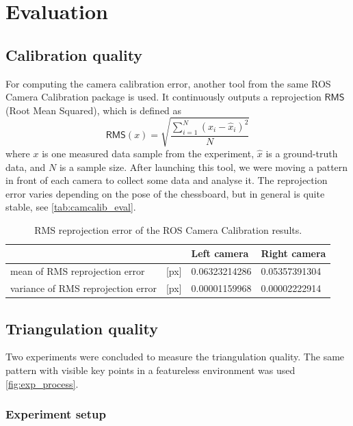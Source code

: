 \chapter{Evaluation}
\label{chapter:evaluation}

\section{Calibration quality}
For computing the camera calibration error, another tool from the same ROS Camera Calibration package is used.
It continuously outputs a reprojection $\mathsf{RMS}$ (Root Mean Squared), which is defined as
\begin{equation}
    \mathsf{RMS}(x) = \sqrt{\frac{\sum_{i=1}^{N}{(x_i - \hat{x}_i)^2}}{N}}
\end{equation}
where $x$ is one measured data sample from the experiment, $\hat{x}$ is a ground-truth data, and $N$ is a sample size.
After launching this tool, we were moving a pattern in front of each camera to collect some data and analyse it.
The reprojection error varies depending on the pose of the chessboard, but in general is quite stable, see \autoref{tab:camcalib_eval}.

\begin{table}[ht]
    \begin{center}
      \begin{tabular}{ ll l l }
      \hline
      && Left camera & Right camera \\ \hline
      mean of RMS reprojection error & [px] & 0.06323214286 & 0.05357391304 \\
      variance of RMS reprojection error & [px] & 0.00001159968 & 0.00002222914 \\
      \end{tabular}
    \end{center}
    \caption{RMS reprojection error of the ROS Camera Calibration results.}
    \label{tab:camcalib_eval}
\end{table}

\section{Triangulation quality}
Two experiments were concluded to measure the triangulation quality.
The same pattern with visible key points in a featureless environment was used \autoref{fig:exp_process}.

\subsection{Experiment setup}
\label{sec:eval_setup}

